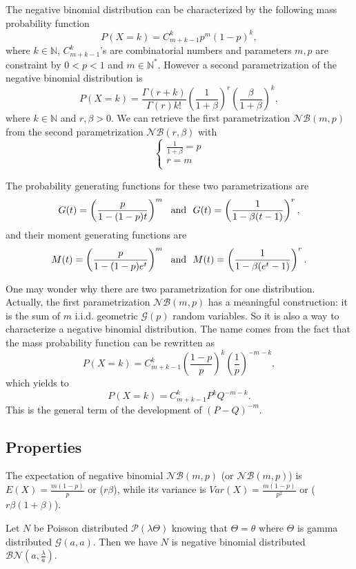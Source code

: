 The negative binomial distribution can be characterized by the following mass probability function
$$
P(X=k) = C_{m+k-1}^{k} p^m(1-p)^{k},
$$
where $k\in\mathbb N$, $C_{m+k-1}^{k}$'s are combinatorial numbers and parameters $m,p$ are constraint by $0<p<1$ and $m\in\mathbb N^*$. However a second parametrization of the negative binomial distribution is
$$
P(X=k)=\frac{\Gamma(r+k)}{\Gamma(r)k!} \left(\frac{1}{1+\beta}\right)^r\left(\frac{\beta}{1+\beta}\right)^k,
$$
where $k\in\mathbb N$ and $r,\beta>0$. We can retrieve the first parametrization $\mathcal N\mathcal B(m,p)$ from the second parametrization $\mathcal N\mathcal B(r,\beta)$ with
$$
\left\{
\begin{array}{c}
\frac{1}{1+\beta} = p\\
r = m\\
\end{array}
\right.
$$

The probability generating functions for these two parametrizations are
$$
G(t)= \left(\frac{p}{1-(1-p)t}\right)^m \textrm{~~and~~} G(t)=\left(\frac{1}{1-\beta(t-1)}\right)^r,
$$
and their moment generating functions are 
$$
M(t)= \left(\frac{p}{1-(1-p)e^{t}}\right)^m \textrm{~~and~~} M(t) = \left(\frac{1}{1-\beta(e^t-1)}\right)^r.
$$

One may wonder why there are two parametrization for one distribution. Actually, the first parametrization $\mathcal N\mathcal B(m,p)$ has a meaningful construction: it is the sum of $m$ i.i.d. geometric $\mathcal G(p)$ random variables. So it is also a way to characterize a negative binomial distribution.
The name comes from the fact that the mass probability function can be rewritten as
$$
P(X=k) = C_{m+k-1}^{k} \left(\frac{1-p}{p}\right)^{k}\left(\frac{1}{p}\right)^{-m-k},
$$
which yields to
$$
P(X=k) = C_{m+k-1}^{k} P^{k}Q^{-m-k}.
$$
This is the general term of the development of $(P-Q)^{-m}$.
 

\subsection{Properties}
The expectation of negative binomial $\mathcal N\mathcal B(m,p)$ (or $\mathcal N\mathcal B(m,p)$) is $E(X) =  \frac{m(1-p)}{p}$ or ($r \beta$), while its variance is $Var(X)=\frac{m(1-p)}{p^2}$ or ($r\beta(1+\beta)$).

Let $N$ be Poisson distributed $\mathcal P(\lambda\Theta)$ knowing that $\Theta=\theta$ where $\Theta$ is gamma distributed $\mathcal G(a,a)$. Then we have $N$ is negative binomial distributed $\mathcal B\mathcal N(a,\frac{\lambda}{a})$. 




